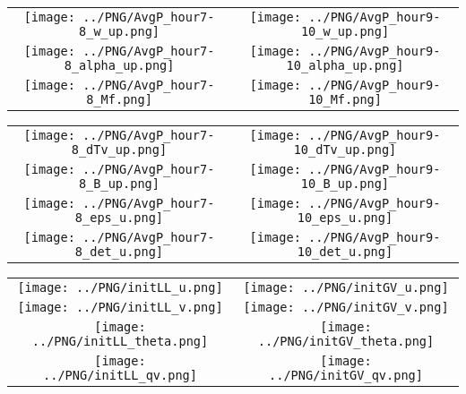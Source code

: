 \documentclass{article}
\begin{document}

\begin{table}
  \begin{tabular}{cc}
     \texttt{[image: ../PNG/AvgP\_hour7-8\_w\_up.png]}     & \texttt{[image: ../PNG/AvgP\_hour9-10\_w\_up.png]}     \\
     \texttt{[image: ../PNG/AvgP\_hour7-8\_alpha\_up.png]} & \texttt{[image: ../PNG/AvgP\_hour9-10\_alpha\_up.png]} \\
     \texttt{[image: ../PNG/AvgP\_hour7-8\_Mf.png]}       & \texttt{[image: ../PNG/AvgP\_hour9-10\_Mf.png]}
  \end{tabular}
\end{table}

\newpage

\begin{table}
  \begin{tabular}{cc}
     \texttt{[image: ../PNG/AvgP\_hour7-8\_dTv\_up.png]} & \texttt{[image: ../PNG/AvgP\_hour9-10\_dTv\_up.png]} \\
     \texttt{[image: ../PNG/AvgP\_hour7-8\_B\_up.png]}   & \texttt{[image: ../PNG/AvgP\_hour9-10\_B\_up.png]}   \\
     \texttt{[image: ../PNG/AvgP\_hour7-8\_eps\_u.png]}  & \texttt{[image: ../PNG/AvgP\_hour9-10\_eps\_u.png]}  \\
     \texttt{[image: ../PNG/AvgP\_hour7-8\_det\_u.png]}  & \texttt{[image: ../PNG/AvgP\_hour9-10\_det\_u.png]}
  \end{tabular}
\end{table}

\newpage

\begin{table}
  \begin{tabular}{cc}
     \texttt{[image: ../PNG/initLL\_u.png]}     & \texttt{[image: ../PNG/initGV\_u.png]}     \\
     \texttt{[image: ../PNG/initLL\_v.png]}     & \texttt{[image: ../PNG/initGV\_v.png]}     \\
     \texttt{[image: ../PNG/initLL\_theta.png]} & \texttt{[image: ../PNG/initGV\_theta.png]} \\
     \texttt{[image: ../PNG/initLL\_qv.png]}    & \texttt{[image: ../PNG/initGV\_qv.png]}
  \end{tabular}
\end{table}
\end{document}
